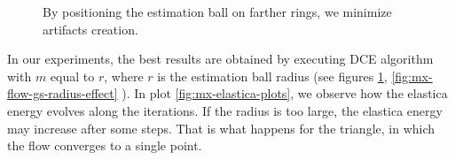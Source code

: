 \documentclass[runningheads]{llncs}
\begin{document}
\begin{figure}[!ht]
\begin{minipage}[b]{0.33\textwidth}
{	}%
\end{minipage}%
\begin{minipage}[b]{0.33\textwidth}
\end{minipage}%
\caption{By positioning the estimation ball on farther rings, we minimize artifacts creation. \label{fig:mx-square-flow}}
\end{figure}

In our experiments, the best results are obtained by executing DCE
algorithm with $m$ equal to $r$, where $r$ is the estimation ball
radius (see figures \ref{fig:mx-square-flow},
\ref{fig:mx-flow-gs-radius-effect} ). In plot
\ref{fig:mx-elastica-plots}, we observe how the elastica energy evolves along
the iterations. If the radius is too large, the elastica energy may increase after some steps. That is what happens for the
triangle, in which the flow converges to a single point.
\end{document}
